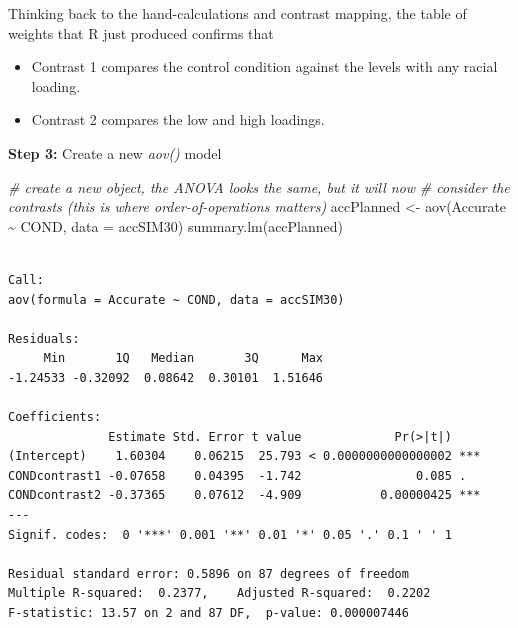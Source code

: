 \documentclass[
  11pt,
]{book}
\newenvironment{Shaded}{\begin{snugshade}}{\end{snugshade}}
\newcommand{\AttributeTok}[1]{\textcolor[rgb]{0.77,0.63,0.00}{#1}}
\newcommand{\CommentTok}[1]{\textcolor[rgb]{0.56,0.35,0.01}{\textit{#1}}}
\newcommand{\DecValTok}[1]{\textcolor[rgb]{0.00,0.00,0.81}{#1}}
\newcommand{\FunctionTok}[1]{\textcolor[rgb]{0.00,0.00,0.00}{#1}}
\newcommand{\NormalTok}[1]{#1}
\newcommand{\OtherTok}[1]{\textcolor[rgb]{0.56,0.35,0.01}{#1}}
\newcommand{\SpecialCharTok}[1]{\textcolor[rgb]{0.00,0.00,0.00}{#1}}
\providecommand{\tightlist}{%
  \setlength{\itemsep}{0pt}\setlength{\parskip}{0pt}}
\begin{document}
Thinking back to the hand-calculations and contrast mapping, the table of weights that R just produced confirms that

\begin{itemize}
\tightlist
\item
  Contrast 1 compares the control condition against the levels with any racial loading.
\item
  Contrast 2 compares the low and high loadings.
\end{itemize}

\textbf{Step 3:} Create a new \emph{aov()} model

\begin{Shaded}
\begin{Highlighting}[]
\CommentTok{\# create a new object, the ANOVA looks the same, but it will now}
\CommentTok{\# consider the contrasts (this is where order{-}of{-}operations matters)}
\NormalTok{accPlanned }\OtherTok{\textless{}{-}} \FunctionTok{aov}\NormalTok{(Accurate }\SpecialCharTok{\textasciitilde{}}\NormalTok{ COND, }\AttributeTok{data =}\NormalTok{ accSIM30)}
\FunctionTok{summary.lm}\NormalTok{(accPlanned)}
\end{Highlighting}
\end{Shaded}

\begin{verbatim}

Call:
aov(formula = Accurate ~ COND, data = accSIM30)

Residuals:
     Min       1Q   Median       3Q      Max 
-1.24533 -0.32092  0.08642  0.30101  1.51646 

Coefficients:
              Estimate Std. Error t value             Pr(>|t|)    
(Intercept)    1.60304    0.06215  25.793 < 0.0000000000000002 ***
CONDcontrast1 -0.07658    0.04395  -1.742                0.085 .  
CONDcontrast2 -0.37365    0.07612  -4.909           0.00000425 ***
---
Signif. codes:  0 '***' 0.001 '**' 0.01 '*' 0.05 '.' 0.1 ' ' 1

Residual standard error: 0.5896 on 87 degrees of freedom
Multiple R-squared:  0.2377,    Adjusted R-squared:  0.2202 
F-statistic: 13.57 on 2 and 87 DF,  p-value: 0.000007446
\end{verbatim}

\begin{Shaded}
\end{Shaded}
\end{document}
